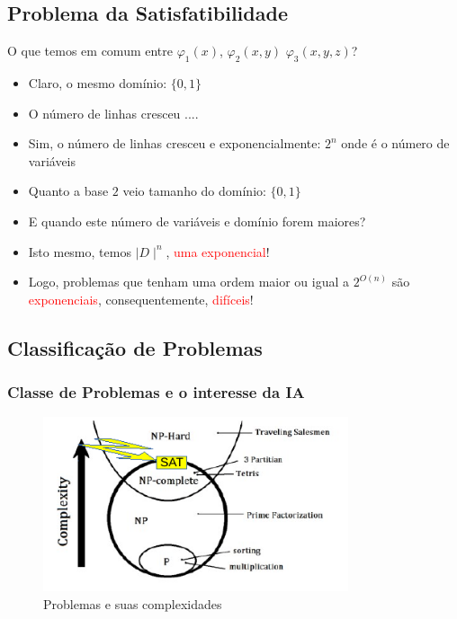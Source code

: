 \documentclass{beamer}
\begin{document}
\subsection{Problema da Satisfatibilidade}

\begin{frame}[fragile]

\begin{block}{O que temos em comum entre $\varphi_1 (x)$, $\varphi_2 (x,y)$
$\varphi_3 (x,y,z)$?}
\pause
\begin{itemize}
  \item Claro, o mesmo domínio: $\{0,1\}$ 
  \item O número de linhas cresceu ....
  \pause
    \item Sim, o número de linhas cresceu e exponencialmente: \textbf{$2^{n}$} onde é o número
    de variáveis 
      \item Quanto a base $2$ veio tamanho do domínio: $\{0,1\}$
      \pause
      \item E quando este número de variáveis e domínio forem maiores?
\pause
      \item Isto mesmo, temos $\mid D\mid ^{n}$, \textcolor{red}{uma exponencial}!
\pause
  \item Logo, problemas que tenham uma ordem maior ou igual a {\Large \textbf{$2^{O(n)}$}}
  são \textcolor{red}{exponenciais}, consequentemente, \textcolor{red}{difíceis}!
  \end{itemize}

\end{block}

\end{frame}



\subsection{Classificação de Problemas}

\begin{frame}
\frametitle{Classe de Problemas e o interesse da IA}

\begin{figure}[ht!]
 \centering
 \includegraphics[width=0.8\textwidth , height=0.6\textheight]{classes_problemas.pdf}
 \caption{Problemas e suas complexidades} 
\end{figure}

\end{frame}
\end{document}
